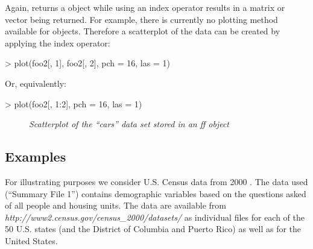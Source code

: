 \documentclass[12pt,a4paper]{article}
\begin{document}
Again,  returns a  object while using an index operator results in a matrix or vector being returned. 
For example, there is currently no plotting method available for  objects. 
Therefore a scatterplot of the data can be created by applying the index operator:

\begin{Schunk}
\begin{Sinput}
> plot(foo2[, 1], foo2[, 2], pch = 16, las = 1)
\end{Sinput}
\end{Schunk}

Or, equivalently:

\begin{Schunk}
\begin{Sinput}
> plot(foo2[, 1:2], pch = 16, las = 1)
\end{Sinput}
\end{Schunk}
\begin{figure}[h]
  \begin{center}
    \caption{\textsl{Scatterplot of the ``cars'' data set stored in an ff object}}
    \label{scatter0blahblahyaddablah}
  \end{center}
\end{figure}




\subsection{Examples}

For illustrating purposes we consider U.S. Census data from 2000 \citep{uscensus}. 
The data used (``Summary File 1'') contains demographic variables based on the questions asked of all people and housing units. 
The data are available from \textit{http://www2.census.gov/census\_2000/datasets/} as individual files for each of the 50 U.S. states (and the District of Columbia and Puerto Rico) as well as for the United States.
\end{document}
